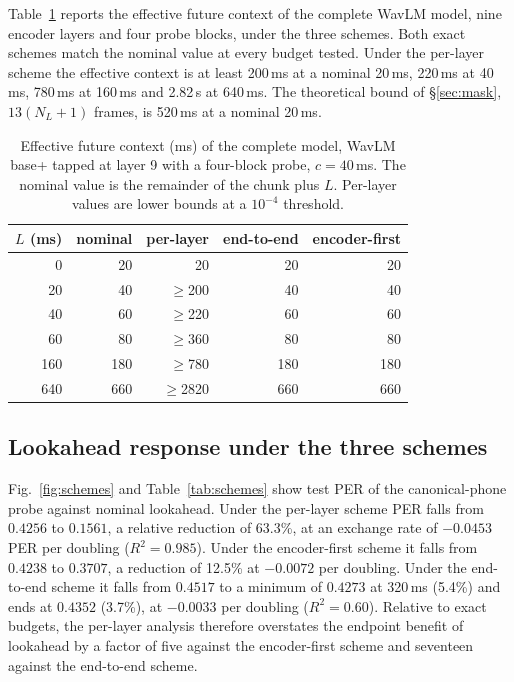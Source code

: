 \documentclass[journal]{IEEEtran}
\begin{document}
Table~\ref{tab:reach} reports the effective future context of the complete
WavLM model, nine encoder layers and four probe blocks, under the three
schemes. Both exact schemes match the nominal value at every budget tested.
Under the per-layer scheme the effective context is at least 200\,ms at a
nominal 20\,ms, 220\,ms at 40\,ms, 780\,ms at 160\,ms and 2.82\,s at
640\,ms. The theoretical bound of \S\ref{sec:mask}, $13(N_L+1)$ frames, is
520\,ms at a nominal 20\,ms.

\begin{table}[t]
\centering\footnotesize
\setlength{\tabcolsep}{4pt}
\renewcommand{\arraystretch}{0.93}
\caption{Effective future context (ms) of the complete model, WavLM base+
tapped at layer 9 with a four-block probe, $c=40$\,ms. The nominal value is
the remainder of the chunk plus $L$. Per-layer values are lower bounds at a
$10^{-4}$ threshold.}
\label{tab:reach}
\begin{tabular}{rrrrr}
\toprule
$L$ (ms) & nominal & per-layer & end-to-end & encoder-first \\
\midrule
0   & 20  & 20          & 20  & 20 \\
20  & 40  & $\geq$200   & 40  & 40 \\
40  & 60  & $\geq$220   & 60  & 60 \\
60  & 80  & $\geq$360   & 80  & 80 \\
160 & 180 & $\geq$780   & 180 & 180 \\
640 & 660 & $\geq$2820  & 660 & 660 \\
\bottomrule
\end{tabular}
\end{table}

\subsection{Lookahead response under the three schemes}
\label{sec:schemes}

Fig.~\ref{fig:schemes} and Table~\ref{tab:schemes} show test PER of the
canonical-phone probe against nominal lookahead. Under the per-layer scheme
PER falls from $0.4256$ to $0.1561$, a relative reduction of 63.3\%, at an
exchange rate of $-0.0453$ PER per doubling ($R^2=0.985$). Under the
encoder-first scheme it falls from $0.4238$ to $0.3707$, a reduction of
12.5\% at $-0.0072$ per doubling. Under the end-to-end scheme it falls from
$0.4517$ to a minimum of $0.4273$ at 320\,ms (5.4\%) and ends at $0.4352$
(3.7\%), at $-0.0033$ per doubling ($R^2=0.60$). Relative to exact budgets,
the per-layer analysis therefore overstates the endpoint benefit of lookahead
by a factor of five against the encoder-first scheme and seventeen against
the end-to-end scheme.
\end{document}
